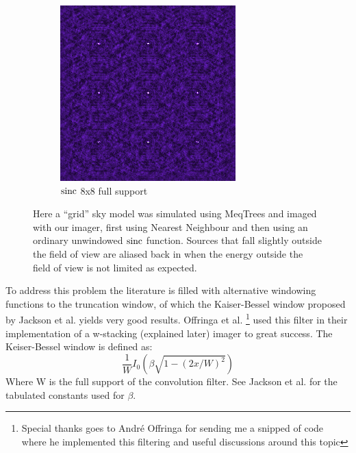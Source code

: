 \begin{figure}[h]
\begin{mdframed}
\begin{subfigure}[b]{0.35\textwidth}
      \includegraphics[width=\textwidth]{images/ratt_aa_kernel_demo_larger_support.png}
      \caption{$\operatorname*{sinc}$ 8x8 full support}
    \end{subfigure}
    \caption[Alias reduction]{Here a ``grid'' sky model was simulated using MeqTrees\cite{noordam2010meqtrees} and imaged with our imager, first 
    using Nearest Neighbour and then using an ordinary unwindowed $\operatorname*{sinc}$ function. Sources that fall slightly outside the field of view are 
    aliased back in when the energy outside the field of view is not limited as expected.}
    \label{fig_aliasing_nn_vs_sinc}
  \end{mdframed}
 \end{figure}
 
 To address this problem the literature is filled with alternative windowing functions to the truncation window, of which 
 the Kaiser-Bessel window proposed by Jackson et al. \cite{jackson1991selection} yields very good results. 
 Offringa et al. \cite{offringa2014wsclean}\footnote{Special thanks goes to Andr\'e Offringa for sending me a snipped of code
 where he implemented this filtering and useful discussions around this topic} used this filter in their implementation of a 
 w-stacking (explained later) imager to great success. The Keiser-Bessel window is defined as:
 \begin{equation}
  \frac{1}{W}I_0(\beta\sqrt{1-(2x/W)^2})
 \end{equation}
 Where W is the full support of the convolution filter. See Jackson et al.\cite{jackson1991selection} for the tabulated constants used 
 for $\beta$.

